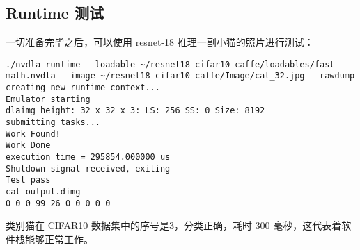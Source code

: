 \subsection{Runtime 测试}

一切准备完毕之后，可以使用 resnet-18 推理一副小猫的照片进行测试：

\begin{lstlisting}
./nvdla_runtime --loadable ~/resnet18-cifar10-caffe/loadables/fast-math.nvdla --image ~/resnet18-cifar10-caffe/Image/cat_32.jpg --rawdump
creating new runtime context...
Emulator starting
dlaimg height: 32 x 32 x 3: LS: 256 SS: 0 Size: 8192
submitting tasks...
Work Found!
Work Done
execution time = 295854.000000 us
Shutdown signal received, exiting
Test pass
cat output.dimg 
0 0 0 99 26 0 0 0 0 0 
\end{lstlisting}

类别猫在 CIFAR10 数据集中的序号是3，分类正确，耗时 300 毫秒，这代表着软件栈能够正常工作。